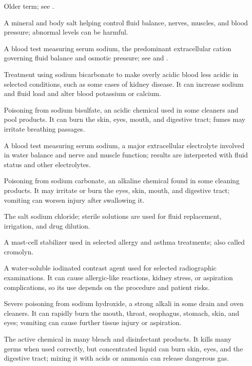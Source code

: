  Older term; see .

 A mineral and body salt helping control fluid balance, nerves, muscles, and blood pressure; abnormal levels can be harmful.

 A blood test measuring serum sodium, the predominant extracellular cation governing fluid balance and osmotic pressure; see  and .

 Treatment using sodium bicarbonate to make overly acidic blood less acidic in selected conditions, such as some cases of kidney disease. It can increase sodium and fluid load and alter blood potassium or calcium.

 Poisoning from sodium bisulfate, an acidic chemical used in some cleaners and pool products. It can burn the skin, eyes, mouth, and digestive tract; fumes may irritate breathing passages.

 A blood test measuring serum sodium, a major extracellular electrolyte involved in water balance and nerve and muscle function; results are interpreted with fluid status and other electrolytes.

 Poisoning from sodium carbonate, an alkaline chemical found in some cleaning products. It may irritate or burn the eyes, skin, mouth, and digestive tract; vomiting can worsen injury after swallowing it.

 The salt sodium chloride; sterile solutions are used for fluid replacement, irrigation, and drug dilution.

 A mast-cell stabilizer used in selected allergy and asthma treatments; also called cromolyn.

 A water-soluble iodinated contrast agent used for selected radiographic examinations. It can cause allergic-like reactions, kidney stress, or aspiration complications, so its use depends on the procedure and patient risks.

 Severe poisoning from sodium hydroxide, a strong alkali in some drain and oven cleaners. It can rapidly burn the mouth, throat, esophagus, stomach, skin, and eyes; vomiting can cause further tissue injury or aspiration.

 The active chemical in many bleach and disinfectant products. It kills many germs when used correctly, but concentrated liquid can burn skin, eyes, and the digestive tract; mixing it with acids or ammonia can release dangerous gas.

